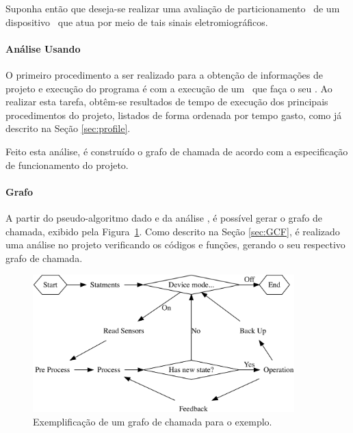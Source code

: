          Suponha então que deseja-se realizar uma avaliação de particionamento \hs\ de um dispositivo \wearable\ que atua por meio de tais sinais eletromiográficos.

      \paragraph{Análise Usando \Profile}
         O primeiro procedimento a ser realizado para a obtenção de informações de projeto e execução do programa é com a execução de um \software\ que faça o seu \profile.
         Ao realizar esta tarefa, obtêm-se resultados de tempo de execução dos principais procedimentos do projeto, listados de forma ordenada por tempo gasto, como já descrito na Seção \ref{sec:profile}.
         
         Feito esta análise, é construído o grafo de chamada de acordo com a especificação de funcionamento do projeto.

      \paragraph{Grafo}
         A partir do pseudo-algoritmo dado e da análise \profile, é possível gerar o grafo de chamada, exibido pela Figura~\ref{fig:graph_w1}.
         Como descrito na Seção \ref{sec:GCF}, é realizado uma análise no projeto verificando os códigos e funções, gerando o seu respectivo grafo de chamada.

         \begin{figure}[h] \centering
            \includegraphics[width=0.9\textwidth]{img/graph_wearable.png}
            \caption{Exemplificação de um grafo de chamada para o exemplo.}
            \label{fig:graph_w1}
         \end{figure}

